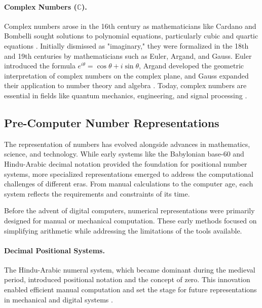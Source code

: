 \paragraph{Complex Numbers (\( \mathbb{C} \)).}
Complex numbers arose in the 16th century as mathematicians like Cardano and Bombelli sought solutions to polynomial equations, particularly cubic and quartic equations \cite{boyer1991history}. Initially dismissed as "imaginary," they were formalized in the 18th and 19th centuries by mathematicians such as Euler, Argand, and Gauss. Euler introduced the formula \( e^{i\theta} = \cos\theta + i\sin\theta \), Argand developed the geometric interpretation of complex numbers on the complex plane, and Gauss expanded their application to number theory and algebra \cite{kline1990mathematics, stewart2015-foundations}. Today, complex numbers are essential in fields like quantum mechanics, engineering, and signal processing \cite{maor2007}.


\subsection{Pre-Computer Number Representations}

The representation of numbers has evolved alongside advances in mathematics, science, and technology. While early systems like the Babylonian base-60 and Hindu-Arabic decimal notation provided the foundation for positional number systems, more specialized representations emerged to address the computational challenges of different eras. From manual calculations to the computer age, each system reflects the requirements and constraints of its time.

Before the advent of digital computers, numerical representations were primarily designed for manual or mechanical computation. These early methods focused on simplifying arithmetic while addressing the limitations of the tools available.

\paragraph{Decimal Positional Systems.}
The Hindu-Arabic numeral system, which became dominant during the medieval period, introduced positional notation and the concept of zero. This innovation enabled efficient manual computation and set the stage for future representations in mechanical and digital systems \cite{ifrah2000, burton2010-history}.

